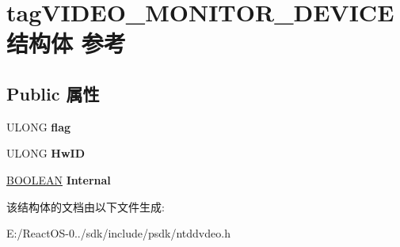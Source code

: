 \hypertarget{structtag_v_i_d_e_o___m_o_n_i_t_o_r___d_e_v_i_c_e}{}\section{tag\+V\+I\+D\+E\+O\+\_\+\+M\+O\+N\+I\+T\+O\+R\+\_\+\+D\+E\+V\+I\+C\+E结构体 参考}
\label{structtag_v_i_d_e_o___m_o_n_i_t_o_r___d_e_v_i_c_e}
\subsection*{Public 属性}
\begin{DoxyCompactItemize}
\item 
\mbox{\label{structtag_v_i_d_e_o___m_o_n_i_t_o_r___d_e_v_i_c_e_a5bd2901369697276198bccda7ad8b450}} 
U\+L\+O\+NG {\bfseries flag}
\item 
\mbox{\label{structtag_v_i_d_e_o___m_o_n_i_t_o_r___d_e_v_i_c_e_a9f2d2fc4aa97d0221b3923b4a4ef5fcc}} 
U\+L\+O\+NG {\bfseries Hw\+ID}
\item 
\mbox{\label{structtag_v_i_d_e_o___m_o_n_i_t_o_r___d_e_v_i_c_e_ab8d2e107efb5ecf83ebc422517bb561f}} 
\hyperlink{_processor_bind_8h_a112e3146cb38b6ee95e64d85842e380a}{B\+O\+O\+L\+E\+AN} {\bfseries Internal}
\end{DoxyCompactItemize}


该结构体的文档由以下文件生成\+:\begin{DoxyCompactItemize}
\item 
E\+:/\+React\+O\+S-\/0../sdk/include/psdk/ntddvdeo.\+h\end{DoxyCompactItemize}

